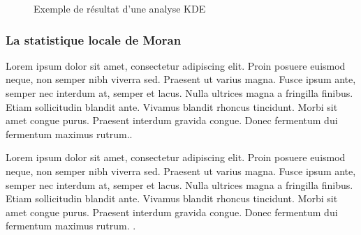 \medskip


\begin{figure}[hbt!]
  \centering
  \caption{Exemple de résultat d'une analyse KDE \parencite{romano_visualizing_2017}}
  \label{fig:kde-result}
\end{figure}
\FloatBarrier

\medskip

\subsubsection{La statistique locale de Moran}
Lorem ipsum dolor sit amet, consectetur adipiscing elit. Proin posuere euismod neque, non semper nibh viverra sed. Praesent ut varius magna. Fusce ipsum ante, semper nec interdum at, semper et lacus. Nulla ultrices magna a fringilla finibus. Etiam sollicitudin blandit ante. Vivamus blandit rhoncus tincidunt. Morbi sit amet congue purus. Praesent interdum gravida congue. Donec fermentum dui fermentum maximus rutrum.\parencite{hart_kernel_2014}. 

\medskip

Lorem ipsum dolor sit amet, consectetur adipiscing elit. Proin posuere euismod neque, non semper nibh viverra sed. Praesent ut varius magna. Fusce ipsum ante, semper nec interdum at, semper et lacus. Nulla ultrices magna a fringilla finibus. Etiam sollicitudin blandit ante. Vivamus blandit rhoncus tincidunt. Morbi sit amet congue purus. Praesent interdum gravida congue. Donec fermentum dui fermentum maximus rutrum. \parencite{chang_introduction_2019}.

\medskip

